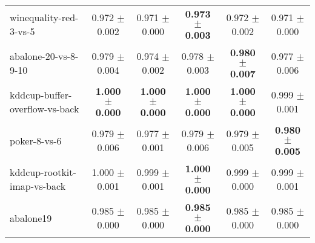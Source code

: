 \begin{table}[!ht]
{\begin{tabular}{l c c c c c}
winequality-red-3-vs-5 & 0.972 $\pm$ 0.002 & 0.971 $\pm$ 0.000 & \textbf{0.973 $\pm$ 0.003} & 0.972 $\pm$ 0.002 & 0.971 $\pm$ 0.000 \\
abalone-20-vs-8-9-10 & 0.979 $\pm$ 0.004 & 0.974 $\pm$ 0.002 & 0.978 $\pm$ 0.003 & \textbf{0.980 $\pm$ 0.007} & 0.977 $\pm$ 0.006 \\
kddcup-buffer-overflow-vs-back & \textbf{1.000 $\pm$ 0.000} & \textbf{1.000 $\pm$ 0.000} & \textbf{1.000 $\pm$ 0.000} & \textbf{1.000 $\pm$ 0.000} & 0.999 $\pm$ 0.001 \\
poker-8-vs-6 & 0.979 $\pm$ 0.006 & 0.977 $\pm$ 0.001 & 0.979 $\pm$ 0.006 & 0.979 $\pm$ 0.005 & \textbf{0.980 $\pm$ 0.005} \\
kddcup-rootkit-imap-vs-back & 1.000 $\pm$ 0.001 & 0.999 $\pm$ 0.001 & \textbf{1.000 $\pm$ 0.000} & 0.999 $\pm$ 0.000 & 0.999 $\pm$ 0.001 \\
abalone19 & 0.985 $\pm$ 0.000 & 0.985 $\pm$ 0.000 & \textbf{0.985 $\pm$ 0.000} & 0.985 $\pm$ 0.000 & 0.985 $\pm$ 0.000 \\
\end{tabular}}
\end{table}

